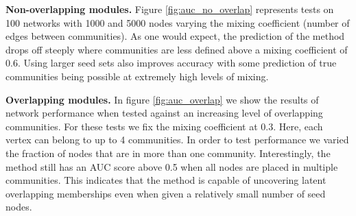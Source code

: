 \documentclass[sigconf]{acmart}
\begin{document}
\textbf{Non-overlapping modules.} Figure \ref{fig:auc_no_overlap} represents tests on 100 networks with 1000 and 5000 nodes varying the mixing coefficient (number of edges between communities).
As one would expect, the prediction of the method drops off steeply where communities are less defined above a mixing coefficient of 0.6.
Using larger seed sets also improves accuracy with some prediction of true communities being possible at extremely high levels of mixing.

\textbf{Overlapping modules.} 
In figure \ref{fig:auc_overlap} we show the results of network performance when tested against an increasing level of overlapping communities.
For these tests we fix the mixing coefficient at $0.3$.
Here, each vertex can belong to up to 4 communities.
In order to test performance we varied the fraction of nodes that are in more than one community.
Interestingly, the method still has an AUC score above 0.5 when all nodes are placed in multiple communities.
This indicates that the method is capable of uncovering latent overlapping memberships even when given a relatively small number of seed nodes.
\end{document}
